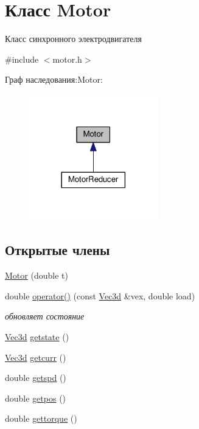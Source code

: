 \hypertarget{classMotor}{}\section{Класс Motor}
\label{classMotor}


Класс синхронного электродвигателя  




{\ttfamily \#include $<$motor.\+h$>$}



Граф наследования\+:Motor\+:\nopagebreak
\begin{figure}[H]
\begin{center}
\leavevmode
\includegraphics[width=158pt]{classMotor__inherit__graph}
\end{center}
\end{figure}
\subsection*{Открытые члены}
\begin{DoxyCompactItemize}
\item 
\hyperlink{classMotor_a060931682af482a7f7b1169304cbcd52}{Motor} (double t)
\item 
double \hyperlink{classMotor_a30091b07e2c1aa8d85047f84e3137c79}{operator()} (const \hyperlink{structVec3}{Vec3d} \&vex, double load)
\begin{DoxyCompactList}\small\item\em обновляет состояние \end{DoxyCompactList}\item 
\hyperlink{structVec3}{Vec3d} \hyperlink{classMotor_a55899b432198761a45182151c5817df1}{getstate} ()
\item 
\hyperlink{structVec3}{Vec3d} \hyperlink{classMotor_a519cb1cf6fd48ce81f718eb340bbe9df}{getcurr} ()
\item 
double \hyperlink{classMotor_aced401ab0a40ead568739392cea51748}{getspd} ()
\item 
double \hyperlink{classMotor_a2252f262ca385e6a1ae217c9f2f9d282}{getpos} ()
\item 
double \hyperlink{classMotor_ac14e02e5c16a5ffe35815fe2bf586fbe}{gettorque} ()
\end{DoxyCompactItemize}
